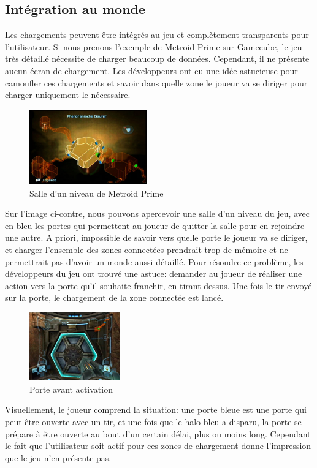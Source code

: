 \documentclass[a4paper, 11pt]{article} %
\begin{document}
\newpage
\subsection{Intégration au monde}
Les chargements peuvent être intégrés au jeu et complètement transparents pour l'utilisateur. Si nous prenons l'exemple de Metroid Prime sur Gamecube, le jeu très détaillé nécessite de charger beaucoup de données. Cependant, il ne présente aucun écran de chargement. Les développeurs ont eu une idée astucieuse pour camoufler ces chargements et savoir dans quelle zone le joueur va se diriger pour charger uniquement le nécessaire.

\begin{figure}
\begin{center}
\includegraphics[width=0.45\textwidth]{images/metroid-prime_map.png}
\end{center}
\caption{Salle d'un niveau de Metroid Prime}
\end{figure}

Sur l'image ci-contre, nous pouvons apercevoir une salle d'un niveau du jeu, avec en bleu les portes qui permettent au joueur de quitter la salle pour en rejoindre une autre. A priori, impossible de savoir vers quelle porte le joueur va se diriger, et charger l'ensemble des zones connectées prendrait trop de mémoire et ne permettrait pas d'avoir un monde aussi détaillé. Pour résoudre ce problème, les développeurs du jeu ont trouvé une astuce: demander au joueur de réaliser une action vers la porte qu'il souhaite franchir, en tirant dessus. Une fois le tir envoyé sur la porte, le chargement de la zone connectée est lancé.

\begin{figure}
\begin{center}
\includegraphics[width=0.35\textwidth]{images/metroid-prime_door.png}
\end{center}
\caption{Porte avant activation}
\end{figure}
Visuellement, le joueur comprend la situation: une porte bleue est une porte qui peut être ouverte avec un tir, et une fois que le halo bleu a disparu, la porte se prépare à être ouverte au bout d'un certain délai, plus ou moins long. Cependant le fait que l'utilisateur soit actif pour ces zones de chargement donne l'impression que le jeu n'en présente pas.
\end{document}

